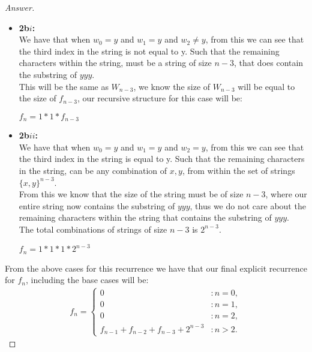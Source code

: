 \documentclass[11pt]{article}
\theoremstyle{definition}
\theoremstyle{definition}
\theoremstyle{definition}
\begin{document}
\begin{proof}[Answer]
\begin{itemize}
\begin{itemize}
\begin{itemize}
\item \textbf{2b$i$:} \\
We have that when $w_0 = y$ and $w_1 = y$ and $w_2 \neq y$, from this we can see that the third index in the string is not equal to y. Such that the remaining characters within the string, must be a string of size $n-3$, that does contain the substring of $yyy$. \\

This will be the same as $W_{n-3}$, we know the size of $W_{n-3}$ will be equal to the size of $f_{n-3}$, our recursive structure for this case will be: \\
\begin{center}
$f_n = 1 * 1 * f_{n-3}$
\end{center}
\item \textbf{2b$ii$:} \\
We have that when $w_0 = y$ and $w_1 = y$ and $w_2 = y$, from this we can see that the third index in the string is equal to y. Such that the remaining characters in the string, can be any combination of $x, y$, from within the set of strings $\{x, y\}^{n-3}$. \\

From this we know that the size of the string must be of size $n-3$, where our entire string now contains the substring of $yyy$, thus we do not care about the remaining characters within the string that contains the substring of $yyy$. \\

The total combinations of strings of size $n-3$ is $2^{n-3}$. \\

\begin{center}
$f_n = 1 * 1 * 1 * 2^{n-3}$
\end{center}
\end{itemize} 
\end{itemize}
\end{itemize}

From the above cases for this recurrence we have that our final explicit recurrence for $f_n$, including the base cases will be: \\
\begin{align*}
f_n = \begin{cases}
0 & : n = 0, \\
0 & : n = 1, \\
0 & : n = 2, \\
f_{n-1} + f_{n-2} + f_{n-3} + 2^{n-3 }& : n > 2.
\end{cases}
\end{align*}
\end{proof}
\end{document}
